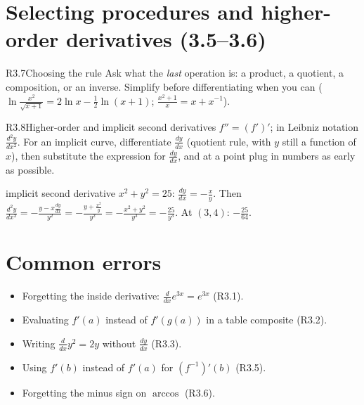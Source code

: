 \documentclass{apcalc}
\begin{document}
\section{Selecting procedures and higher-order derivatives (3.5--3.6)}

\begin{rulebox}{R3.7}{Choosing the rule}
Ask what the \emph{last} operation is: a product, a quotient, a composition, or an inverse. Simplify before differentiating when you can ($\ln\frac{x^2}{\sqrt{x+1}}=2\ln x-\frac12\ln(x+1)$; $\frac{x^2+1}{x}=x+x^{-1}$).
\end{rulebox}

\begin{rulebox}{R3.8}{Higher-order and implicit second derivatives}
$f''=(f')'$; in Leibniz notation $\frac{d^2y}{dx^2}$. For an implicit curve, differentiate $\frac{dy}{dx}$ (quotient rule, with $y$ still a function of $x$), then substitute the expression for $\frac{dy}{dx}$, and at a point plug in numbers as early as possible.
\end{rulebox}

\begin{example}{implicit second derivative}
$x^2+y^2=25$: $\frac{dy}{dx}=-\frac{x}{y}$. Then $\frac{d^2y}{dx^2}=-\frac{y-x\frac{dy}{dx}}{y^2}=-\frac{y+\frac{x^2}{y}}{y^2}=-\frac{x^2+y^2}{y^3}=-\frac{25}{y^3}$. At $(3,4)$: $-\frac{25}{64}$. 
\end{example}

\section{Common errors}
\begin{itemize}
\item Forgetting the inside derivative: $\frac{d}{dx}e^{3x}=e^{3x}$ (R3.1).
\item Evaluating $f'(a)$ instead of $f'(g(a))$ in a table composite (R3.2).
\item Writing $\frac{d}{dx}y^2=2y$ without $\frac{dy}{dx}$ (R3.3).
\item Using $f'(b)$ instead of $f'(a)$ for $(f^{-1})'(b)$ (R3.5).
\item Forgetting the minus sign on $\arccos$ (R3.6).
\end{itemize}
\end{document}

